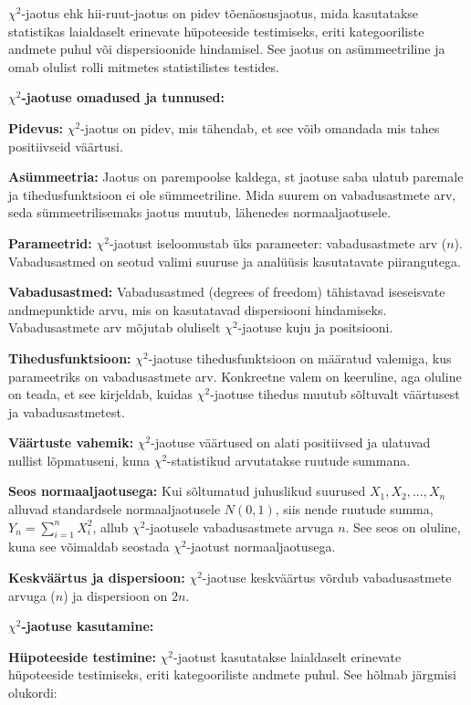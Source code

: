 \documentclass[
]{book}
\begin{document}
\(\chi^2\)-jaotus ehk hii-ruut-jaotus on pidev tõenäosusjaotus, mida kasutatakse statistikas laialdaselt erinevate hüpoteeside testimiseks, eriti kategooriliste andmete puhul või dispersioonide hindamisel. See jaotus on asümmeetriline ja omab olulist rolli mitmetes statistilistes testides.

\textbf{\(\chi^2\)-jaotuse omadused ja tunnused:}

\textbf{Pidevus:} \(\chi^2\)-jaotus on pidev, mis tähendab, et see võib omandada mis tahes positiivseid väärtusi.

\textbf{Asümmeetria:} Jaotus on parempoolse kaldega, st jaotuse saba ulatub paremale ja tihedusfunktsioon ei ole sümmeetriline. Mida suurem on vabadusastmete arv, seda sümmeetrilisemaks jaotus muutub, lähenedes normaaljaotusele.

\textbf{Parameetrid:} \(\chi^2\)-jaotust iseloomustab üks parameeter: vabadusastmete arv (\(n\)). Vabadusastmed on seotud valimi suuruse ja analüüsis kasutatavate piirangutega.

\textbf{Vabadusastmed:} Vabadusastmed (degrees of freedom) tähistavad iseseisvate andmepunktide arvu, mis on kasutatavad dispersiooni hindamiseks. Vabadusastmete arv mõjutab oluliselt \(\chi^2\)-jaotuse kuju ja positsiooni.

\textbf{Tihedusfunktsioon:} \(\chi^2\)-jaotuse tihedusfunktsioon on määratud valemiga, kus parameetriks on vabadusastmete arv. Konkreetne valem on keeruline, aga oluline on teada, et see kirjeldab, kuidas \(\chi^2\)-jaotuse tihedus muutub sõltuvalt väärtusest ja vabadusastmetest.

\textbf{Väärtuste vahemik:} \(\chi^2\)-jaotuse väärtused on alati positiivsed ja ulatuvad nullist lõpmatuseni, kuna \(\chi^2\)-statistikud arvutatakse ruutude summana.

\textbf{Seos normaaljaotusega:} Kui sõltumatud juhuslikud suurused \(X_1, X_2, ..., X_n\) alluvad standardsele normaaljaotusele \(N(0, 1)\), siis nende ruutude summa, \(Y_n = \sum_{i=1}^n X_i^2\), allub \(\chi^2\)-jaotusele vabadusastmete arvuga \(n\). See seos on oluline, kuna see võimaldab seostada \(\chi^2\)-jaotust normaaljaotusega.

\textbf{Keskväärtus ja dispersioon:} \(\chi^2\)-jaotuse keskväärtus võrdub vabadusastmete arvuga (\(n\)) ja dispersioon on \(2n\).

\textbf{\(\chi^2\)-jaotuse kasutamine:}

\textbf{Hüpoteeside testimine:} \(\chi^2\)-jaotust kasutatakse laialdaselt erinevate hüpoteeside testimiseks, eriti kategooriliste andmete puhul. See hõlmab järgmisi olukordi:
\end{document}

